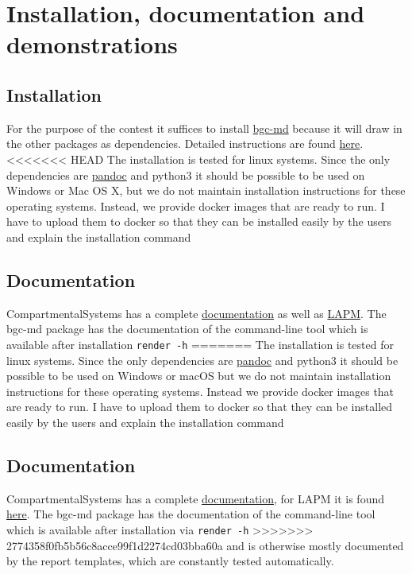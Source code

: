 \documentclass[a4paper]{article}
\begin{document}
\section{Installation, documentation and demonstrations}


\subsection{Installation}
For the purpose of the contest it suffices to install \href{https://github.com/MPIBGC-TEE/bgc-md}{bgc-md} because it will draw in the other packages as dependencies. Detailed instructions are found \href{https://github.com/MPIBGC-TEE/bgc-md#installation}{here}.
<<<<<<< HEAD
The installation is tested for linux systems. Since the only dependencies are \href{https://pandoc.org/installing.html}{pandoc} and python3 it should be possible to be used on Windows or Mac OS X, but we do not maintain installation instructions for these operating systems.
Instead, we provide docker images that are ready to run. {\color{red} I have to upload them to  docker so that they can be installed easily by the users and explain the installation command}


\subsection{Documentation}
CompartmentalSystems has a complete \href{http://compartmentalsystems.readthedocs.io/en/latest/}{documentation}
as well as \href{http://lapm.readthedocs.io/en/latest/}{LAPM}. The bgc-md package has the documentation of the command-line tool which is available after installation \texttt{render -h} 
=======
The installation is tested for linux systems. Since the only dependencies are \href{https://pandoc.org/installing.html}{pandoc} and python3 it should be possible to be used on Windows or macOS but we do not maintain installation instructions for these operating systems.
Instead we provide docker images that are ready to run. {\color{red} I have to upload them to  docker so that they can be installed easily by the users and explain the installation command}


\subsection{Documentation}
CompartmentalSystems has a complete \href{http://compartmentalsystems.readthedocs.io/en/latest/}{documentation}, for LAPM it is found \href{http://lapm.readthedocs.io/en/latest/}{here}. 
The bgc-md package has the documentation of the command-line tool which is available after installation via  \texttt{render -h} 
>>>>>>> 2774358f0fb5b56c8acce99f1d2274cd03bba60a
and is otherwise mostly documented by the report templates, which are constantly tested automatically.
\end{document}
